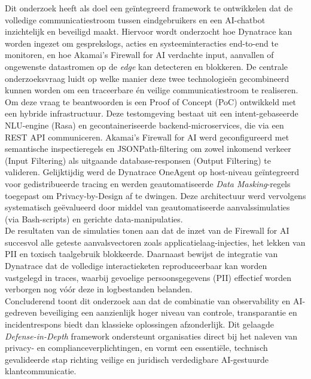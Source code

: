 Dit onderzoek heeft als doel een geïntegreerd framework te ontwikkelen dat de volledige communicatiestroom tussen eindgebruikers en een AI-chatbot inzichtelijk en beveiligd maakt. Hiervoor wordt onderzocht hoe Dynatrace kan worden ingezet om gesprekslogs, acties en systeeminteracties end-to-end te monitoren, en hoe Akamai’s Firewall for AI verdachte input, aanvallen of ongewenste datastromen op de \textit{edge} kan detecteren en blokkeren. De centrale onderzoeksvraag luidt op welke manier deze twee technologieën gecombineerd kunnen worden om een traceerbare én veilige communicatiestroom te realiseren.
    \\
    
Om deze vraag te beantwoorden is een Proof of Concept (PoC) ontwikkeld met een hybride infrastructuur. Deze testomgeving bestaat uit een intent-gebaseerde NLU-engine (Rasa) en gecontaineriseerde backend-microservices, die via een REST API communiceren. Akamai's Firewall for AI werd geconfigureerd met semantische inspectieregels en JSONPath-filtering om zowel inkomend verkeer (Input Filtering) als uitgaande database-responsen (Output Filtering) te valideren. Gelijktijdig werd de Dynatrace OneAgent op host-niveau geïntegreerd voor gedistribueerde tracing en werden geautomatiseerde \textit{Data Masking}-regels toegepast om Privacy-by-Design af te dwingen. Deze architectuur werd vervolgens systematisch geëvalueerd door middel van geautomatiseerde aanvalssimulaties (via Bash-scripts) en gerichte data-manipulaties.
    \\

De resultaten van de simulaties tonen aan dat de inzet van de Firewall for AI succesvol alle geteste aanvalsvectoren zoals applicatielaag-injecties, het lekken van PII en toxisch taalgebruik blokkeerde. Daarnaast bewijst de integratie van Dynatrace dat de volledige interactieketen reproduceerbaar kan worden vastgelegd in traces, waarbij gevoelige persoonsgegevens (PII) effectief worden verborgen nog vóór deze in logbestanden belanden.
    \\
    
Concluderend toont dit onderzoek aan dat de combinatie van observability en AI-gedreven beveiliging een aanzienlijk hoger niveau van controle, transparantie en incidentrespons biedt dan klassieke oplossingen afzonderlijk. Dit gelaagde \textit{Defense-in-Depth} framework ondersteunt organisaties direct bij het naleven van privacy- en complianceverplichtingen, en vormt een essentiële, technisch gevalideerde stap richting veilige en juridisch verdedigbare AI-gestuurde klantcommunicatie.


